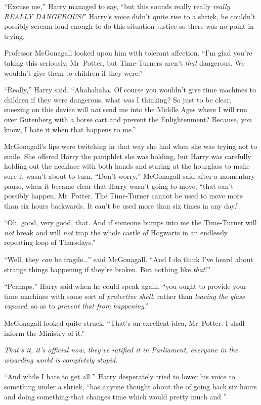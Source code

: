 “Excuse me,” Harry managed to say, “but this sounds really really \emph{really REALLY DANGEROUS!}” Harry’s voice didn’t quite rise to a shriek, he couldn’t possibly scream loud enough to do this situation justice so there was no point in trying.

Professor McGonagall looked upon him with tolerant affection. “I’m glad you’re taking this seriously, Mr~Potter, but Time-Turners aren’t \emph{that} dangerous. We wouldn’t give them to children if they were.”

“Really,” Harry said. “Ahahahaha. Of course you wouldn’t give time machines to children if they were dangerous, what \emph{was} I thinking? So just to be clear, sneezing on this device will \emph{not} send me into the Middle Ages where I will run over Gutenberg with a horse cart and prevent the Enlightenment? Because, you know, I hate it when that happens to me.”

McGonagall’s lips were twitching in that way she had when she was trying not to smile. She offered Harry the pamphlet she was holding, but Harry was carefully holding out the necklace with both hands and staring at the hourglass to make sure it wasn’t about to turn. “Don’t worry,” McGonagall said after a momentary pause, when it became clear that Harry wasn’t going to move, “that can’t possibly happen, Mr~Potter. The Time-Turner cannot be used to move more than six hours backwards. It can’t be used more than six times in any day.”

“Oh, good, very good, that. And if someone bumps into me the Time-Turner will \emph{not} break and will \emph{not} trap the whole castle of Hogwarts in an endlessly repeating loop of Thursdays.”

“Well, they \emph{can} be fragile…” said McGonagall. “And I do think I’ve heard about strange things happening if they’re broken. But nothing like \emph{that}!”

“Perhaps,” Harry said when he could speak again, “you ought to provide your time machines with some sort of \emph{protective shell}, rather than \emph{leaving the glass exposed}, so as to \emph{prevent that from happening}.”

McGonagall looked quite struck. “That’s an excellent idea, Mr~Potter. I shall inform the Ministry of it.”

\emph{That’s it, it’s official now, they’ve ratified it in Parliament, everyone in the wizarding world is completely stupid.}

“And while I hate to get all ” Harry desperately tried to lower his voice to something under a shriek, “has anyone thought about the  of going back six hours and doing something that changes time which would pretty much  and ”


